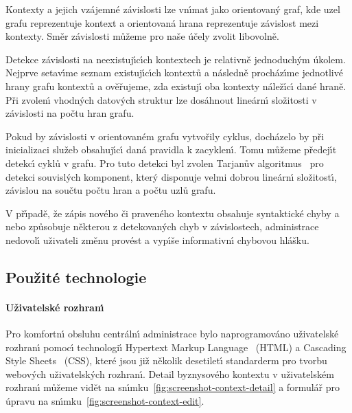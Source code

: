 Kontexty a jejich vzájemné závislosti lze vn\'{\i}mat jako
orientovan\'y graf, kde uzel grafu reprezentuje kontext
a orientovaná hrana reprezentuje závislost mezi kontexty.
Směr závislosti můžeme pro naše účely zvolit libovolně.

Detekce závislosti na neexistuj\'{\i}c\'{\i}ch kontextech je relativně
jednoduch\'ym úkolem. Nejprve setav\'{\i}me seznam existuj\'{\i}c\'{\i}ch kontextů
a následně procház\'{\i}me jednotlivé hrany grafu kontextů a ověřujeme,
zda existuj\'{\i} oba kontexty nálež\'{\i}c\'{\i} dané hraně.
Při zvolen\'{\i} vhodn\'ych datov\'ych struktur lze dosáhnout
lineárn\'{\i} složitosti v závislosti na počtu hran grafu.

Pokud by závislosti v orientovaném grafu vytvořily cyklus,
docházelo by při inicializaci služeb
obsahuj\'{\i}c\'{\i} daná pravidla k zacyklen\'{\i}. Tomu můžeme předej\'{\i}t
detekc\'{\i} cyklů v grafu. Pro tuto detekci byl zvolen
Tarjanův algoritmus~\cite{tarjan1971depth} pro detekci souvisl\'ych
komponent, kter\'y disponuje velmi dobrou lineárn\'{\i} složitost\'{\i},
závislou na součtu počtu hran a počtu uzlů grafu.

V př\'{\i}padě, že zápis nového či praveného kontextu obsahuje syntaktické
chyby a nebo způsobuje některou z detekovan\'ych chyb v závislostech,
administrace nedovol\'{\i} uživateli změnu provést a vyp\'{\i}še informativn\'{\i}
chybovou hlášku.

\subsection{Použité technologie}

\paragraph{Uživatelské rozhran\'{\i}}
Pro komfortn\'{\i} obsluhu centráln\'{\i} administrace bylo naprogramováno
uživatelské rozhran\'{\i} pomoc\'{\i} technologi\'{\i} Hypertext Markup Language~\cite{berners1995hypertext}
(HTML) a Cascading Style Sheets~\cite{bos1998cascading} (\gls{CSS}), které jsou již několik
desetilet\'{\i} standarderm pro tvorbu webov\'ych uživatelsk\'ych rozhran\'{\i}.
Detail byznysového kontextu v uživatelském rozhran\'{\i} můžeme vidět na sn\'{\i}mku~\ref{fig:screenshot-context-detail}
a formulář pro úpravu na sn\'{\i}mku~\ref{fig:screenshot-context-edit}.

